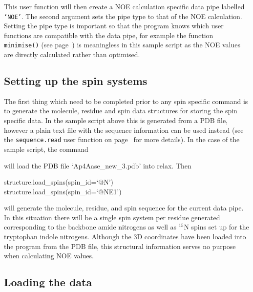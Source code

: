
This user function will then create a NOE calculation specific data pipe labelled \texttt{`NOE'}.  The second argument sets the pipe type to that of the NOE calculation.  Setting the pipe type is important so that the program knows which user functions are compatible with the data pipe, for example the function \texttt{minimise()} (see page~\pageref{uf: minimise}) is meaningless in this sample script as the NOE values are directly calculated rather than optimised.



\subsection{Setting up the spin systems}

The first thing which need to be completed prior to any spin specific command is to generate the molecule, residue and spin data structures for storing the spin specific data.  In the sample script above this is generated from a PDB file, however a plain text file with the sequence information can be used instead (see the \texttt{sequence.read} user function on page~\pageref{uf: sequence.read} for more details).  In the case of the sample script, the command


will load the PDB file `Ap4Aase\_new\_3.pdb' into relax.  Then

\begin{exampleenv}
structure.load\_spins(spin\_id=`@N') \\
structure.load\_spins(spin\_id=`@NE1')
\end{exampleenv}

will generate the molecule, residue, and spin sequence for the current data pipe.  In this situation there will be a single spin system per residue generated corresponding to the backbone amide nitrogens as well as $^{15}$N spins set up for the tryptophan indole nitrogens.  Although the 3D coordinates have been loaded into the program from the PDB file, this structural information serves no purpose when calculating NOE values.



\subsection{Loading the data}

